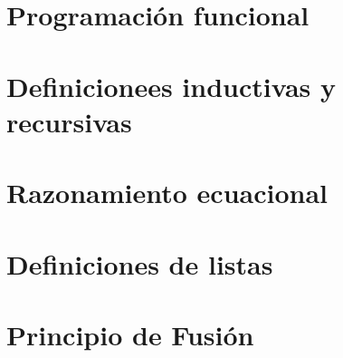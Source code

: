 \lipsum[1-1]

\section{Programación funcional}
\lipsum[2-4]

\section{Definicionees inductivas y recursivas}
\lipsum[2-4]

\section{Razonamiento ecuacional}
\lipsum[2-4]

\section{Definiciones de listas}
\lipsum[2-4]

\section{Principio de Fusión}
\lipsum[2-4]
